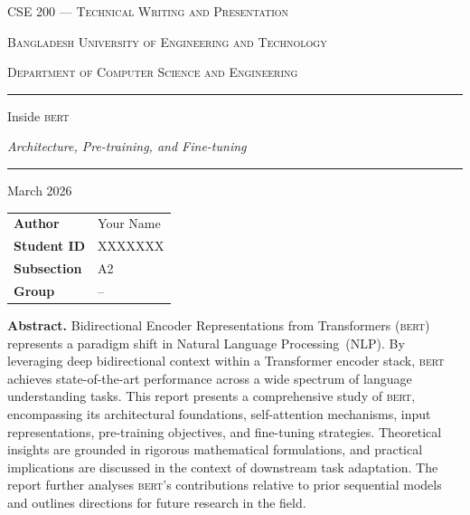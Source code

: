 \documentclass[12pt, a4paper]{article}
\newcommand{\bert}{\textsc{bert}}
\begin{document}

\begin{titlepage}
  \centering
  \vspace{0.6cm}
  {\scshape\large CSE 200 --- Technical Writing and Presentation\par}
  \vspace{0.3cm}
  {\scshape\Large Bangladesh University of Engineering and Technology\par}
  {\scshape Department of Computer Science and Engineering\par}
  \vspace{1.5cm}
  \rule{\linewidth}{1.5pt}\par
  \vspace{0.5cm}
  {\Huge Inside \textsc{bert}\par}
  \vspace{0.3cm}
  {\large\itshape Architecture, Pre-training, and Fine-tuning\par}
  \vspace{0.5cm}
  \rule{\linewidth}{1.5pt}\par
  \vfill
  {\large March 2026\par}
  \vspace{1.2cm}
  \begin{tabular}{ll}
    \textbf{Author}   & Your Name \\[4pt]
    \textbf{Student ID} & XXXXXXX \\[4pt]
    \textbf{Subsection} & A2 \\[4pt]
    \textbf{Group}    & -- \\
  \end{tabular}
\end{titlepage}

\newpage
\begin{abstractbox}
\noindent\textbf{Abstract.}\quad
Bidirectional Encoder Representations from Transformers (\bert{}) represents a
paradigm shift in Natural Language Processing~(NLP). By leveraging deep
bidirectional context within a Transformer encoder stack, \bert{} achieves
state-of-the-art performance across a wide spectrum of language understanding
tasks.  This report presents a comprehensive study of \bert{}, encompassing its
architectural foundations, self-attention mechanisms, input representations,
pre-training objectives, and fine-tuning strategies.  Theoretical insights are
grounded in rigorous mathematical formulations, and practical implications are
discussed in the context of downstream task adaptation.  The report further
analyses \bert{}'s contributions relative to prior sequential models and outlines
directions for future research in the field.
\end{abstractbox}
\end{document}
